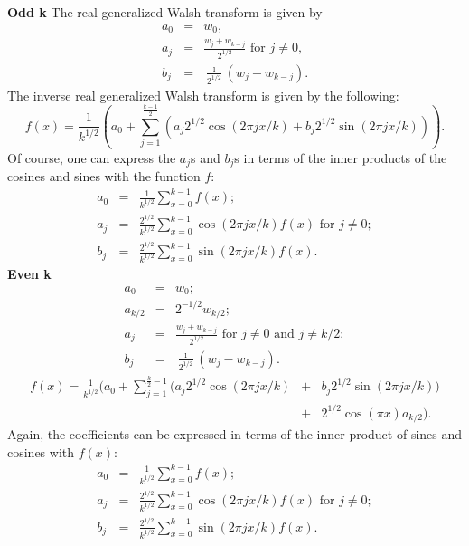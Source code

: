 {\noindent\bf Odd k}  The real generalized Walsh transform is given by
\begin{eqnarray}
a_0 &=& w_0, \nonumber \\
a_j &=& \frac{w_j + w_{k-j}}{2^{1/2}} \mbox{\ for $j \ne 0$},\nonumber \\
b_j &=& \frac{\imath}{2^{1/2}} (w_j - w_{k-j}).
        \label{ajbj1}
\end{eqnarray}
The inverse real generalized Walsh transform is given by the following:
\begin{equation}
f(x)=\frac{1}{k^{1/2}}(a_0+\sum_{j=1}^{\frac{k-1}{2}}{(a_j 2^{1/2} \cos(2 \pi j
x/k) +
         b_j 2^{1/2}\sin(2 \pi j x/k))}).
        \label{fofx1}
\end{equation}
Of course, one can express the $a_j$s and $b_j$s in terms of the inner products
of the cosines and sines with the function $f$:
\begin{eqnarray}
a_0 &=& \frac{1}{k^{1/2}} \sum_{x=0}^{k-1}{f(x)};\nonumber \\
a_j &=& \frac{2^{1/2}}{k^{1/2}} \sum_{x=0}^{k-1} {\cos(2 \pi j x/k) f(x)}
        \mbox{\ for $j\ne 0$};\nonumber \\
b_j &=& \frac{2^{1/2}}{k^{1/2}} \sum_{x=0}^{k-1} {\sin(2 \pi j x/k) f(x)}.
\end{eqnarray}
{\bf Even k}
\begin{eqnarray}
a_0 &=& w_0; \nonumber \\
a_{k/2} &=& 2^{-{1/2}} w_{k/2}; \nonumber \\
a_j &=& \frac{w_j + w_{k-j}}{2^{1/2}} \mbox{\ for $j\ne 0$ and $j\ne k/2$}; \nonumber \\
b_j &=& \frac{\imath}{2^{1/2}} (w_j - w_{k-j}).
                \label{ajbj}
\end{eqnarray}
\begin{eqnarray}
f(x)=\frac{1}{k^{1/2}}(a_0+\sum_{j=1}^{\frac{k}{2}-1}{(a_j 2^{1/2}\cos(2 \pi j x
/k)} &+&
        b_j 2^{1/2} \sin(2 \pi j x/k))\nonumber\\
        &+&2^{1/2} \cos(\pi x) a_{k/2}).
                \label{fofx}
\end{eqnarray}
Again, the coefficients can be expressed in terms of the inner product
of sines and cosines with $f(x)$:
\begin{eqnarray}
a_0 &=& \frac{1}{k^{1/2}} \sum_{x=0}^{k-1}{f(x)}; \nonumber \\
a_j &=& \frac{2^{1/2}}{k^{1/2}} \sum_{x=0}^{k-1} {\cos(2 \pi j x/k) f(x)}
        \mbox{\ for $j\ne 0$};\nonumber \\
b_j &=& \frac{2^{1/2}}{k^{1/2}} \sum_{x=0}^{k-1} {\sin(2 \pi j x/k) f(x)}.
\end{eqnarray}


